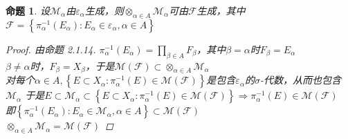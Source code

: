 \documentclass[12pt, a4paper, oneside]{ctexbook}
\newtheorem{proposition}[theorem]{命题}
\begin{document}
\begin{proposition}
    设$\mathcal{M}_{\alpha}$由$\varepsilon_{\alpha}$生成，则$\otimes_{\alpha\in A}\mathcal{M}_{\alpha}$可由$\mathcal{F}$生成，其中\\
    $\mathcal{F}=\left\{\pi_{\alpha}^{-1}(E_{\alpha}):E_{\alpha}\in\varepsilon_{\alpha},\alpha\in A\right\}$
    \begin{proof}
        由命题 2.1.14. $\pi_{\alpha}^{-1}(E_{\alpha})=\prod_{\beta\in A}F_{\beta}$，其中$\beta=\alpha$时$F_{\beta}=E_{\alpha}$\\
        $\beta\neq\alpha$时，$F_{\beta}=X_{\beta}$，于是$\mathcal{M}(\mathcal{F})\subset\otimes_{\alpha\in A}\mathcal{M}_{\alpha}$\\
        对每个$\alpha\in A,\left\{E\subset X_{\alpha}:\pi_{\alpha}^{-1}(E)\in\mathcal{M}(\mathcal{F})\right\}$是包含$\varepsilon_{\alpha}$的$\sigma$-代数，从而也包含$\mathcal{M}_{\alpha}$
        于是$E\subset\mathcal{M}_{\alpha}\subset\left\{E\subset X_{\alpha}:\pi_{\alpha}^{-1}(E)\in\mathcal{M}(\mathcal{F})\right\}\Rightarrow\pi_{\alpha}^{-1}(E)\in\mathcal{M}(\mathcal{F})$\\
        即$\left\{\pi_{\alpha}^{-1}(E_{\alpha}):E_{\alpha}\in\mathcal{M}_{\alpha},\alpha\in A\right\}\subset\mathcal{M}(\mathcal{F})$\\
        $\otimes_{\alpha\in A}\mathcal{M}_{\alpha}=\mathcal{M}(\mathcal{F})$
    \end{proof}
\end{proposition}
\end{document}
